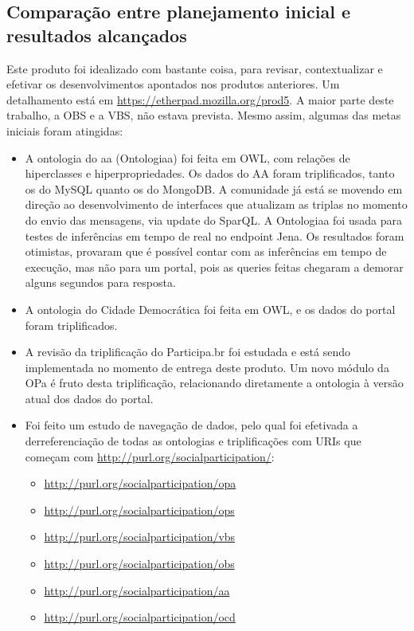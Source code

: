 \documentclass[12pt]{article}
\begin{document}
\subsection{Comparação entre planejamento inicial e resultados alcançados}
Este produto foi idealizado com bastante coisa, para revisar, contextualizar e efetivar os desenvolvimentos apontados nos produtos anteriores. Um detalhamento está em \url{https://etherpad.mozilla.org/prod5}. A maior parte deste trabalho, a OBS e a VBS, não estava prevista. Mesmo assim, algumas das metas iniciais foram atingidas:
\begin{itemize}
    \item A ontologia do aa (Ontologiaa) foi feita em OWL, com relações de hiperclasses e hiperpropriedades. Os dados do AA foram triplificados, tanto os do MySQL quanto os do MongoDB. A comunidade já está se movendo em direção ao desenvolvimento de interfaces que atualizam as triplas no momento do envio das mensagens, via update do SparQL. A Ontologiaa foi usada para testes de inferências em tempo de real no endpoint Jena. Os resultados foram otimistas, provaram que é possível contar com as inferências em tempo de execução, mas não para um portal, pois as queries feitas chegaram a demorar alguns segundos para resposta.
    \item A ontologia do Cidade Democrática foi feita em OWL, e os dados do portal foram triplificados.
    \item A revisão da triplificação do Participa.br foi estudada e está sendo implementada no momento de entrega deste produto. Um novo módulo da OPa é fruto desta triplificação, relacionando diretamente a ontologia à versão atual dos dados do portal.
    \item Foi feito um estudo de navegação de dados, pelo qual foi efetivada a derreferenciação de todas as ontologias e triplificações com URIs que começam com \url{http://purl.org/socialparticipation/}:
\begin{itemize}
    \item \url{http://purl.org/socialparticipation/opa}
    \item \url{http://purl.org/socialparticipation/ops}
    \item \url{http://purl.org/socialparticipation/vbs}
    \item \url{http://purl.org/socialparticipation/obs}
    \item \url{http://purl.org/socialparticipation/aa}
    \item \url{http://purl.org/socialparticipation/ocd}
\end{itemize}
\end{itemize}
\end{document}
